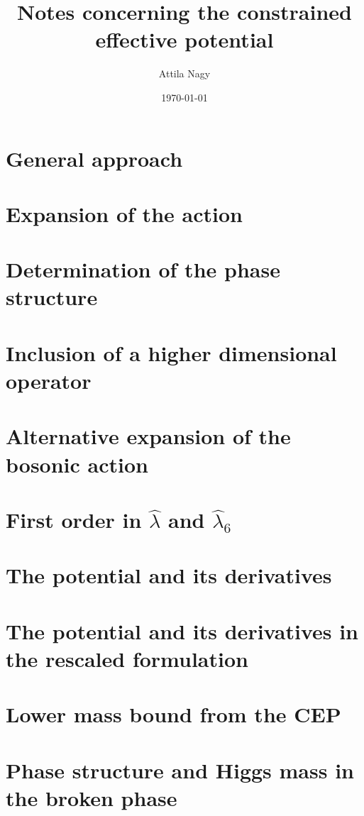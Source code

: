 \documentclass[a4paper,10pt,final]{article}
\title{Notes concerning the constrained effective potential}
\author{Attila Nagy}
\date{\today}
\numberwithin{equation}{section} %
\begin{document}
\section{General approach}

%
\clearpage
%
\section{Expansion of the action}

%
\clearpage
%
\section{Determination of the phase structure}

%
\clearpage
%
\section{Inclusion of a higher dimensional operator}

%
\clearpage
%
\section{Alternative expansion of the bosonic action}

%
\clearpage
%
\section{\texorpdfstring{First order in $\hat\lambda$ and $\hat\lambda_6$}{First order in lambda and lambda6}}

%
\clearpage
%
\section{The potential and its derivatives}

%
\clearpage
%
\section{The potential and its derivatives in the rescaled formulation}

%
\clearpage
%
\section{Lower mass bound from the CEP}

%
\clearpage
%
\section{Phase structure and Higgs mass in the broken phase}

% 
% 
%
\end{document}
